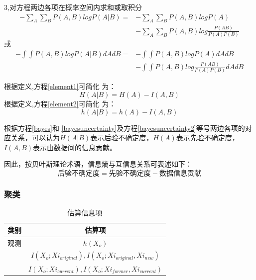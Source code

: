 \documentclass{beamer}
\begin{document}
\begin{CJK}{UTF8}{gkai}
\begin{frame}
3,对方程两边各项在概率空间内求和或取积分
\begin{equation}
\label{element1}
\begin{split}
-\sum_{A} \sum_{B} P(A,B)logP(A|B) =&-\sum_{A} \sum_{B} P
(A,B) logP(A)\\
&-\sum_{A} \sum_{B} P(A,B) log \frac{P (AB)}{P(A)P(B)} 
\end{split}
\end{equation} 
或
\begin{equation}
\label{element2}
\begin{split}
-\int\int P(A,B)logP(A|B)dAdB =&-\int \int P(A,B)logP(A)
dAdB\\
& -\int \int P(A,B)log \frac{P (AB)}{P(A)P(B)}dAdB
\end{split}
\end{equation}

根据定义,方程\ref{element1}可简化
为：
\begin{equation}
\label{bayesuncertainty}
H(A|B) = H(A)-I(A,B)
\end{equation}
根据定义,方程\ref{element2}可简化
为：
\begin{equation}
\label{bayesuncertainty2}
h(A|B) =h(A)-I(A,B)
\end{equation}
\end{frame}

\begin{frame}

根据方程\ref{bayes}和 \ref{bayesuncertainty}及方程\ref{bayesuncertainty2}等号两边各项的对应关系，可以认为$H(A|B)$表示后验不确定度，$H(A)$表示先验不确定度，$I(A,B)$表示由数据间的信息贡献。

因此，按贝叶斯理论术语，信息熵与互信息关系可表述如下：
\begin{equation}
\label{ben}
\text{后验不确定度}=\text{先验不确定度}-\text{数据信息贡献}
\end{equation}
\end{frame}



\begin{frame}
\frametitle{聚类}
\begin{table}[H] 
\centering
\caption{估算信息项}
\label{terms}
\begin{tabular}{cc}
\toprule[1.5 pt]
类别   &  估算项 \\
\midrule[1 pt]
观测   &$h(X_o)$ \\
 
 &$I(X_o;Xi_{original}),I(X_o;Xi_{original},Xi_{new})$\\
 &$I(X_o;Xi_{current}),I(X_o;Xi_{former},Xi_{current})$\\


\end{tabular}
\end{table}
\end{frame}
\end{CJK}
\end{document}
